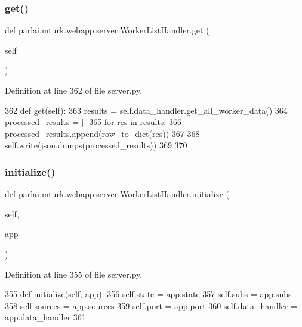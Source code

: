 \subsubsection{\texorpdfstring{get()}{get()}}
{\footnotesize\ttfamily def parlai.\+mturk.\+webapp.\+server.\+Worker\+List\+Handler.\+get (\begin{DoxyParamCaption}\item[{}]{self }\end{DoxyParamCaption})}



Definition at line 362 of file server.\+py.


\begin{DoxyCode}
362     \textcolor{keyword}{def }get(self):
363         results = self.data\_handler.get\_all\_worker\_data()
364         processed\_results = []
365         \textcolor{keywordflow}{for} res \textcolor{keywordflow}{in} results:
366             processed\_results.append(\hyperlink{namespaceparlai_1_1mturk_1_1webapp_1_1server_a92be47964fa33a4b6a14d4069d091c7d}{row\_to\_dict}(res))
367 
368         self.write(json.dumps(processed\_results))
369 
370 
\end{DoxyCode}
\mbox{\label{classparlai_1_1mturk_1_1webapp_1_1server_1_1WorkerListHandler_ad375655741a045539a790aa1eb8878df}} 
\subsubsection{\texorpdfstring{initialize()}{initialize()}}
{\footnotesize\ttfamily def parlai.\+mturk.\+webapp.\+server.\+Worker\+List\+Handler.\+initialize (\begin{DoxyParamCaption}\item[{}]{self,  }\item[{}]{app }\end{DoxyParamCaption})}



Definition at line 355 of file server.\+py.


\begin{DoxyCode}
355     \textcolor{keyword}{def }initialize(self, app):
356         self.state = app.state
357         self.subs = app.subs
358         self.sources = app.sources
359         self.port = app.port
360         self.data\_handler = app.data\_handler
361 
\end{DoxyCode}


